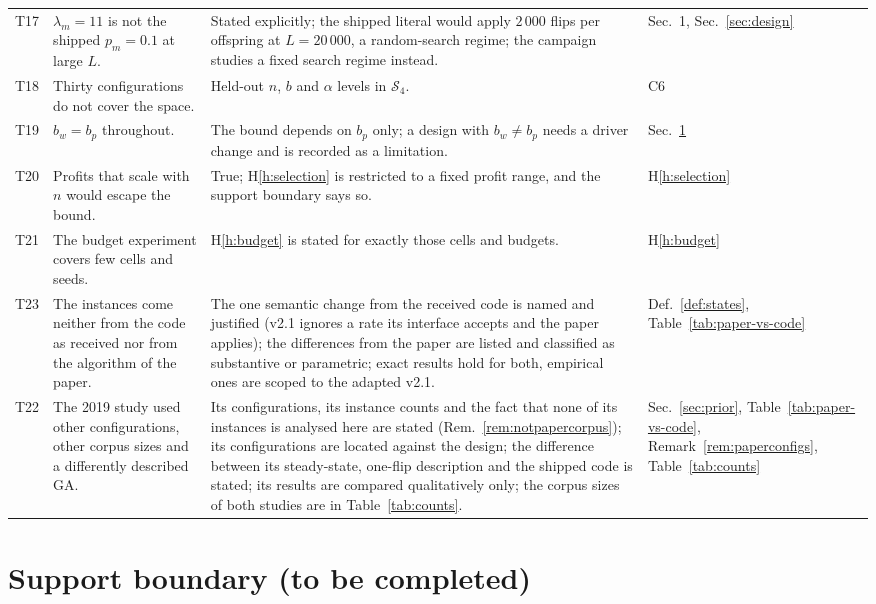\documentclass[a4paper,11pt]{article}
\newcommand{\bw}{b_{w}}
\newcommand{\bp}{b_{p}}
\theoremstyle{plain}
\theoremstyle{definition}
\theoremstyle{remark}
\begin{document}
\begin{center}
\begin{longtable}{@{}p{0.6cm}p{4.6cm}p{6.8cm}p{2.2cm}@{}}
T17 & $\lambda_m=11$ is not the shipped $p_m=0.1$ at large $L$. & Stated explicitly; the shipped literal would apply $2\,000$ flips per offspring at $L=20\,000$, a random-search regime; the campaign studies a fixed search regime instead. & Sec.~1, Sec.~\ref{sec:design} \\
T18 & Thirty configurations do not cover the space. & Held-out $n$, $b$ and $\alpha$ levels in $\mathcal S_4$. & C6 \\
T19 & $\bw=\bp$ throughout. & The bound depends on $\bp$ only; a design with $\bw\ne\bp$ needs a driver change and is recorded as a limitation. & Sec.~\ref{sec:support} \\
T20 & Profits that scale with $n$ would escape the bound. & True; H\ref{h:selection} is restricted to a fixed profit range, and the support boundary says so. & H\ref{h:selection} \\
T21 & The budget experiment covers few cells and seeds. & H\ref{h:budget} is stated for exactly those cells and budgets. & H\ref{h:budget} \\
T23 & The instances come neither from the code as received nor from the algorithm of the paper. & The one semantic change from the received code is named and justified (v2.1 ignores a rate its interface accepts and the paper applies); the differences from the paper are listed and classified as substantive or parametric; exact results hold for both, empirical ones are scoped to the adapted v2.1. & Def.~\ref{def:states}, Table~\ref{tab:paper-vs-code} \\
T22 & The 2019 study used other configurations, other corpus sizes and a differently described GA. & Its configurations, its instance counts and the fact that none of its instances is analysed here are stated (Rem.~\ref{rem:notpapercorpus}); its configurations are located against the design; the difference between its steady-state, one-flip description and the shipped code is stated; its results are compared qualitatively only; the corpus sizes of both studies are in Table~\ref{tab:counts}. & Sec.~\ref{sec:prior}, Table~\ref{tab:paper-vs-code}, Remark~\ref{rem:paperconfigs}, Table~\ref{tab:counts} \\
\bottomrule
\end{longtable}
\end{center}

\section{Support boundary (to be completed)}\label{sec:support}
\end{document}
